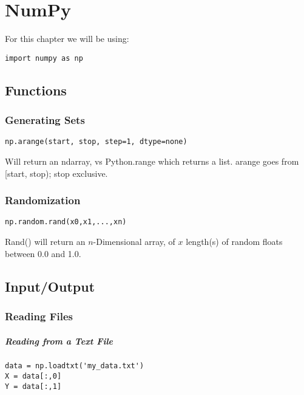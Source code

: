 \chapter{NumPy}
\label{ch:NumPy}

For this chapter we will be using:
\begin{verbatim}
import numpy as np
\end{verbatim}

\section{Functions}

\subsection{Generating Sets}
\begin{verbatim}
np.arange(start, stop, step=1, dtype=none)
\end{verbatim}
Will return an ndarray, vs Python.range which returns a list. 
arange goes from [start, stop); stop exclusive. 

\subsection{Randomization}
\begin{verbatim}
np.random.rand(x0,x1,...,xn)
\end{verbatim}
Rand() will return an $n$-Dimensional array,
of $x$ length(s) of random floats between 0.0 and 1.0. 

\section{Input/Output}
\label{sec:NumPyIO}

\subsection{Reading Files}

\paragraph{Reading from a Text File}
\begin{verbatim}
data = np.loadtxt('my_data.txt')
X = data[:,0]
Y = data[:,1]
\end{verbatim}